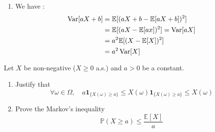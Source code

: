 \begin{solution}
\begin{enumerate}
    \item We have :
          \begin{align*}
            \operatorname{Var}[aX + b] & = \mathbb{E}[(aX+b - \mathbb{E}[aX+b])^2]        \\
                         & = \mathbb{E}[(aX - \mathbb{E}[ax])^2] = \operatorname{Var}[aX] \\
                         & = a^2 \mathbb{E}[(X - \mathbb{E}[X])^2]          \\
                         & = a^2 \operatorname{Var}[X]
          \end{align*}
  \end{enumerate}
\end{solution}

\begin{Exercise}
  Let $X$ be non-negative ($X \geq 0$ a.s.) and $a>0$ be a constant.
  \begin{enumerate}
    \item Justify that
          $$\forall \omega \in \Omega, \quad a \mathbf{1}_{\{X(\omega) \geqslant a\}} \leqslant X(\omega) \mathbf{1}_{\{X(\omega) \geqslant a\}} \leqslant X(\omega)$$
    \item Prove the Markov's inequality
          $$
            \mathbb{P}(X \geq a) \leq \frac{\mathbb{E}[X]}{a}
          $$
  \end{enumerate}
\end{Exercise}

